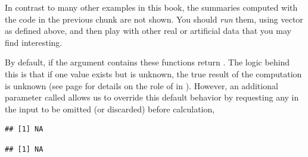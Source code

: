 \documentclass[krantz2]{krantz}\usepackage{knitr}
\begin{document}
\begin{knitrout}\footnotesize
{}\color{fgcolor}\begin{kframe}
\begin{alltt}
 \hlkwb{<-} \hlopt{:}
\end{alltt}
\end{kframe}
\end{knitrout}

\begin{playground}
  In contrast to many other examples in this book, the summaries computed with the code in the previous chunk are not shown. You should \emph{run} them, using vector  as defined above, and then play with other real or artificial data that you may find interesting.%
\end{playground}

By default, if the argument contains  these functions return . The logic behind this is that if one value exists but is unknown, the true result of the computation is unknown (see page \pageref{par:special:values} for details on the role of  in \Rlang). However, an additional parameter called  allows us to override this default behavior by requesting any  in the input to be omitted (or discarded) before calculation,

\begin{knitrout}\footnotesize
{}\color{fgcolor}\begin{kframe}
\begin{alltt}
 \hlkwb{<-} \hlstd{(}\hlopt{:}\hlstd{,} \hlstd{)}
\end{alltt}
\begin{verbatim}
## [1] NA
\end{verbatim}
\begin{alltt}
  \hlstd{=} \hlstd{)}
\end{alltt}
\begin{verbatim}
## [1] NA
\end{verbatim}
\end{kframe}
\end{knitrout}
\end{document}
